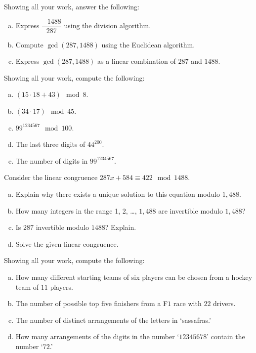 \documentclass[12pt,letterpaper]{exam}
\begin{document}
\begin{questions}
\newpage
\question[10] Showing all your work, answer the following:
	\begin{enumerate}[(a)]
	\item Express $\dfrac{-1488}{287}$ using the division algorithm. 
	\item Compute $\gcd(287, 1488)$ using the Euclidean algorithm. 
	\item Express $\gcd(287, 1488)$ as a linear combination of $287$ and $1488$. 
	\end{enumerate}



\newpage
\question[10] Showing all your work, compute the following:
	\begin{enumerate}[(a)]
	\item $(15 \cdot 18 + 43) \mod 8$.
	\item $(34 \cdot 17) \mod 45$.
	\item $99^{1234567} \mod 100$.
	\item The last three digits of $44^{200}$.
	\item The number of digits in $99^{1234567}$. 
	\end{enumerate}



\newpage
\question[10] Consider the linear congruence $287x + 584 \equiv 422 \mod 1488$. 
	\begin{enumerate}[(a)]
	\item Explain why there exists a unique solution to this equation modulo $1,\!488$. 
	\item How many integers in the range 1, 2, \ldots, $1,\!488$ are invertible modulo $1,\!488$?
	\item Is $287$ invertible modulo $1488$? Explain. 
	\item Solve the given linear congruence. 
	\end{enumerate}



\newpage
\question[10] Showing all your work, compute the following:
	\begin{enumerate}[(a)]
	\item How many different starting teams of six players can be chosen from a hockey team of $11$ players. 
	\item The number of possible top five finishers from a F$1$ race with $22$ drivers. 
	\item The number of distinct arrangements of the letters in `sassafras.'
	\item How many arrangements of the digits in the number `$12345678$' contain the number `$72$.'
	\end{enumerate}




\end{questions}
\end{document}
